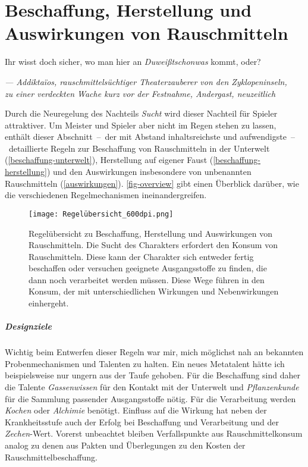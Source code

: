 \chapter{Beschaffung, Herstellung und Auswirkungen von Rauschmitteln}
\epigraph{Ihr wisst doch sicher, wo man hier an \textit{Duweißtschonwas} kommt, oder?}{\textit{--- Addiktaïos, rauschmittelsüchtiger Theaterzauberer von den Zyklopeninseln,\\ zu einer verdeckten Wache kurz vor der Festnahme, Andergast, neuzeitlich}}
\noindent Durch die Neuregelung des Nachteils \emph{Sucht} wird dieser Nachteil für Spieler attraktiver. Um Meister und Spieler aber nicht im Regen stehen zu lassen, enthält dieser Abschnitt~--~der mit Abstand inhaltsreichste und aufwendigste~--~detaillierte Regeln zur Beschaffung von Rauschmitteln in der Unterwelt (\vref{beschaffung-unterwelt}), Herstellung auf eigener Faust (\vref{beschaffung-herstellung}) und den Auswirkungen insbesondere von unbenannten Rauschmitteln (\vref{auswirkungen}). \vref{fig-overview} gibt einen Überblick darüber, wie die verschiedenen Regelmechanismen ineinandergreifen.

\begin{figure}
	\begin{center}
		\texttt{[image: Regelübersicht\_600dpi.png]}
		\caption[Regelübersicht zu Beschaffung, Herstellung und Auswirkungen von Rauschmitteln]{Regelübersicht zu Beschaffung, Herstellung und Auswirkungen von Rauschmitteln. Die Sucht des Charakters erfordert den Konsum von Rauschmitteln. Diese kann der Charakter sich entweder fertig beschaffen oder versuchen geeignete Ausgangsstoffe zu finden, die dann noch verarbeitet werden müssen. Diese Wege führen in den Konsum, der mit unterschiedlichen Wirkungen und Nebenwirkungen einhergeht.\label{fig-overview}}
	\end{center}
\end{figure}

\paragraph{Designziele}
Wichtig beim Entwerfen dieser Regeln war mir, mich möglichst nah an bekannten Probenmechanismen und Talenten zu halten. Ein neues Metatalent hätte ich beispielsweise nur ungern aus der Taufe gehoben. Für die Beschaffung sind daher die Talente \emph{Gassenwissen} für den Kontakt mit der Unterwelt und \emph{Pflanzenkunde} für die Sammlung passender Ausgangsstoffe nötig. Für die Verarbeitung werden \emph{Kochen} oder \emph{Alchimie} benötigt. Einfluss auf die Wirkung hat neben der Krankheitsstufe auch der Erfolg bei Beschaffung und Verarbeitung und der \emph{Zechen}-Wert. Vorerst unbeachtet bleiben Verfallspunkte aus Rauschmittelkonsum analog zu denen aus Pakten \cite[S.~390]{WdZ} und Überlegungen zu den Kosten der Rauschmittelbeschaffung.

